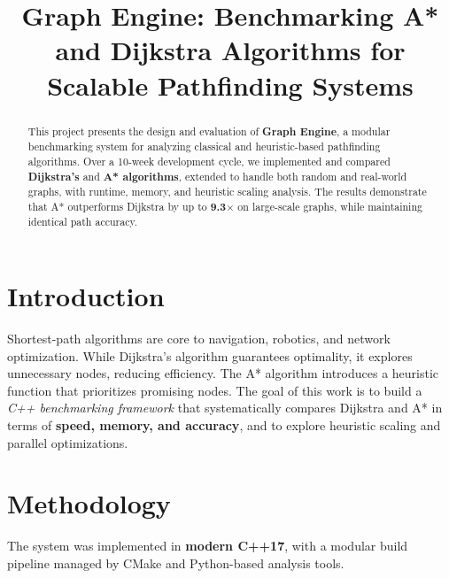 \documentclass[conference]{IEEEtran}
\title{\textbf{Graph Engine: Benchmarking A* and Dijkstra Algorithms for Scalable Pathfinding Systems}}
\author{
  \IEEEauthorblockN{Narendra Kumar Gupta}
  \IEEEauthorblockA{
    Dept. of Electronics \& Instrumentation Engineering \\
    National Institute of Technology, Silchar \\
    \texttt{narugupta01@gmail.com.com}
  }
}
\begin{document}
\maketitle

\begin{abstract}
This project presents the design and evaluation of \textbf{Graph Engine}, a modular benchmarking system for analyzing classical and heuristic-based pathfinding algorithms. Over a 10-week development cycle, we implemented and compared \textbf{Dijkstra's} and \textbf{A* algorithms}, extended to handle both random and real-world graphs, with runtime, memory, and heuristic scaling analysis. The results demonstrate that A* outperforms Dijkstra by up to \textbf{9.3$\times$} on large-scale graphs, while maintaining identical path accuracy.
\end{abstract}

\section{Introduction}
Shortest-path algorithms are core to navigation, robotics, and network optimization. While Dijkstra’s algorithm guarantees optimality, it explores unnecessary nodes, reducing efficiency. The A* algorithm introduces a heuristic function that prioritizes promising nodes. The goal of this work is to build a \textit{C++ benchmarking framework} that systematically compares Dijkstra and A* in terms of \textbf{speed, memory, and accuracy}, and to explore heuristic scaling and parallel optimizations.

\section{Methodology}
The system was implemented in \textbf{modern C++17}, with a modular build pipeline managed by CMake and Python-based analysis tools.
\end{document}
